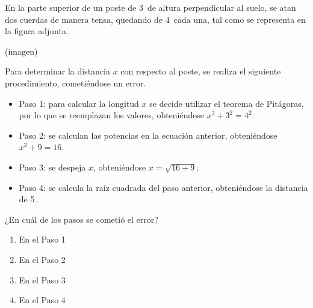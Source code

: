 \begin{problem}
    En la parte superior de un poste de 3\, de altura perpendicular al suelo, se atan dos cuerdas de manera tensa, quedando de 4\, cada una, tal como se representa en la figura adjunta.

    \begin{center}
    (imagen)
    \end{center}

    Para determinar la distancia $x$ con respecto al poste, se realiza el siguiente procedimiento, cometiéndose un error.

    \begin{itemize}
        \item Paso 1: para calcular la longitud $x$ se decide utilizar el teorema de Pitágoras, por lo que se reemplazan los valores, obteniéndose $x^2 + 3^2 = 4^2$.
        \item Paso 2: se calculan las potencias en la ecuación anterior, obteniéndose $x^2 + 9 = 16$.
        \item Paso 3: se despeja $x$, obteniéndose $x = \sqrt{16 + 9}$.
        \item Paso 4: se calcula la raíz cuadrada del paso anterior, obteniéndose la distancia de 5\,.
    \end{itemize}

    ¿En cuál de los pasos se cometió el error?

    \begin{enumerate}[label=\Alph*.]
        \item En el Paso 1
        \item En el Paso 2
        \item En el Paso 3
        \item En el Paso 4
    \end{enumerate}
\end{problem}
